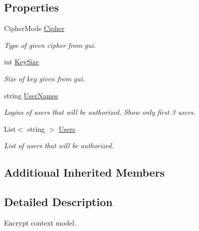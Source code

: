 \subsection*{Properties}
\begin{DoxyCompactItemize}
\item 
Cipher\+Mode \mbox{\hyperlink{class_b_s_k___encryption_1_1_view_models_1_1_encrypte_data_view_model_a6f8281ab3e59382172dbc14fca178299}{Cipher}}
\begin{DoxyCompactList}\small\item\em Type of given cipher from gui. \end{DoxyCompactList}\item 
int \mbox{\hyperlink{class_b_s_k___encryption_1_1_view_models_1_1_encrypte_data_view_model_a3740668ba5cb3c98ed43244ac8789e5f}{Key\+Size}}
\begin{DoxyCompactList}\small\item\em Size of key given from gui. \end{DoxyCompactList}\item 
string \mbox{\hyperlink{class_b_s_k___encryption_1_1_view_models_1_1_encrypte_data_view_model_af8159eea8b1c4b4498db95f5d0cefa18}{User\+Names}}
\begin{DoxyCompactList}\small\item\em Logins of users that will be authorized. Show only first 3 users. \end{DoxyCompactList}\item 
List$<$ string $>$ \mbox{\hyperlink{class_b_s_k___encryption_1_1_view_models_1_1_encrypte_data_view_model_ac7978e5838d18b867c66fa667bb5613e}{Users}}
\begin{DoxyCompactList}\small\item\em List of users that will be authorized. \end{DoxyCompactList}\end{DoxyCompactItemize}
\subsection*{Additional Inherited Members}


\subsection{Detailed Description}
Encrypt context model. 



